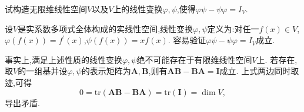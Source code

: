 \documentclass[../../main.tex]{subfiles}%
\begin{document}
\begin{example}
试构造无限维线性空间\(V\)以及\(V\)上的线性变换\(\varphi,\psi\),使得\(\varphi\psi-\psi\varphi = I_V\).
\end{example}
\begin{solution}

设\(V\)是实系数多项式全体构成的实线性空间,线性变换\(\varphi,\psi\)定义为:对任一\(f(x)\in V\),\(\varphi(f(x)) = f^\prime(x)\),\(\psi(f(x)) = xf(x)\). 容易验证\(\varphi\psi-\psi\varphi = I_V\)成立.

\end{solution}
\begin{remark}
事实上,满足上述性质的线性变换\(\varphi,\psi\)绝不可能存在于有限维线性空间\(V\)上. 若存在,取\(V\)的一组基并设\(\varphi,\psi\)的表示矩阵为\(\boldsymbol{A},\boldsymbol{B}\),则有\(\boldsymbol{A}\boldsymbol{B}-\boldsymbol{B}\boldsymbol{A}=\boldsymbol{I}\)成立. 上式两边同时取迹,可得
\[
0=\text{tr}(\boldsymbol{A}\boldsymbol{B}-\boldsymbol{B}\boldsymbol{A})=\text{tr}(\boldsymbol{I})=\dim V,
\]
导出矛盾.
\end{remark}
\end{document}

